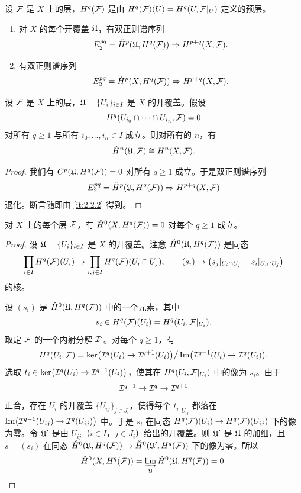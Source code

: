 \begin{proposition}\label{it:2.3.7}
设 $\mathcal{F}$ 是 $X$ 上的层，$H^q(\mathcal{F})$ 是由 $H^q(\mathcal{F})(U)=H^q(U,\mathcal{F}|_U)$ 定义的预层。
\begin{enumerate}[label=(\roman*),leftmargin=2.8em]
  \item 对 $X$ 的每个开覆盖 $\mathfrak{U}$，有双正则谱序列
  \[
  E_2^{pq}=\check{H}^p(\mathfrak{U},H^q(\mathcal{F}))\Rightarrow H^{p+q}(X,\mathcal{F}).
  \]
  \item 有双正则谱序列
  \[
  E_2^{pq}=\check{H}^p(X,H^q(\mathcal{F}))\Rightarrow H^{p+q}(X,\mathcal{F}).
  \]
\end{enumerate}
\end{proposition}

\begin{corollary}\label{it:2.3.8}
设 $\mathcal{F}$ 是 $X$ 上的层，$\mathfrak{U}=\{U_i\}_{i\in I}$ 是 $X$ 的开覆盖。假设
\[
H^q(U_{i_0}\cap\cdots\cap U_{i_n},\mathcal{F})=0
\]
对所有 $q\ge 1$ 与所有 $i_0,\dots,i_n\in I$ 成立。则对所有的 $n$，有
\[
\check{H}^n(\mathfrak{U},\mathcal{F})\cong H^n(X,\mathcal{F}).
\]
\end{corollary}

\begin{proof}
我们有 $C^p(\mathfrak{U},H^q(\mathcal{F}))=0$ 对所有 $q\ge 1$ 成立。于是双正则谱序列
\[
E_2^{pq}=\check{H}^p(\mathfrak{U},H^q(\mathcal{F}))\Rightarrow H^{p+q}(X,\mathcal{F})
\]
退化。断言随即由 \ref{it:2.2.2} 得到。
\end{proof}

\begin{lemma}\label{it:2.3.9}
对 $X$ 上的每个层 $\mathcal{F}$，有 $\check{H}^0(X,H^q(\mathcal{F}))=0$ 对每个 $q\ge 1$ 成立。
\end{lemma}

\begin{proof}
设 $\mathfrak{U}=\{U_i\}_{i\in I}$ 是 $X$ 的开覆盖。注意 $\check{H}^0(\mathfrak{U},H^q(\mathcal{F}))$ 是同态
\[
\prod_{i\in I}H^q(\mathcal{F})(U_i)\to\prod_{i,j\in I}H^q(\mathcal{F})(U_i\cap U_j),\qquad
(s_i)\mapsto\bigl(s_j|_{U_i\cap U_j}-s_i|_{U_i\cap U_j}\bigr)
\]
的核。

设 $(s_i)$ 是 $\check{H}^0(\mathfrak{U},H^q(\mathcal{F}))$ 中的一个元素，其中
\[
s_i\in H^q(\mathcal{F})(U_i)=H^q(U_i,\mathcal{F}|_{U_i}).
\]
取定 $\mathcal{F}$ 的一个内射分解 $\mathcal{I}^\cdot$。对每个 $q\ge 1$，有
\[
H^q(U_i,\mathcal{F})=\ker\bigl(\mathcal{I}^q(U_i)\to\mathcal{I}^{q+1}(U_i)\bigr)\big/\operatorname{Im}\bigl(\mathcal{I}^{q-1}(U_i)\to\mathcal{I}^q(U_i)\bigr).
\]
选取 $t_i\in\ker\bigl(\mathcal{I}^q(U_i)\to\mathcal{I}^{q+1}(U_i)\bigr)$，使其在 $H^q(U_i,\mathcal{F}|_{U_i})$ 中的像为 $s_i$。由于
\[
\mathcal{I}^{q-1}\to\mathcal{I}^q\to\mathcal{I}^{q+1}
\]
正合，存在 $U_i$ 的开覆盖 $\{U_{ij}\}_{j\in J_i}$，使得每个 $t_i|_{U_{ij}}$ 都落在 $\operatorname{Im}\bigl(\mathcal{I}^{q-1}(U_{ij})\to\mathcal{I}^q(U_{ij})\bigr)$ 中。于是 $s_i$ 在同态 $H^q(\mathcal{F})(U_i)\to H^q(\mathcal{F})(U_{ij})$ 下的像为零。令 $\mathfrak{U}'$ 是由 $U_{ij}$（$i\in I$，$j\in J_i$）给出的开覆盖。则 $\mathfrak{U}'$ 是 $\mathfrak{U}$ 的加细，且 $s=(s_i)$ 在同态 $\check{H}^0(\mathfrak{U},H^q(\mathcal{F}))\to\check{H}^0(\mathfrak{U}',H^q(\mathcal{F}))$ 下的像为零。所以
\[
\check{H}^0(X,H^q(\mathcal{F}))=\varinjlim_{\mathfrak{U}}\check{H}^0(\mathfrak{U},H^q(\mathcal{F}))=0.
\]
\end{proof}

